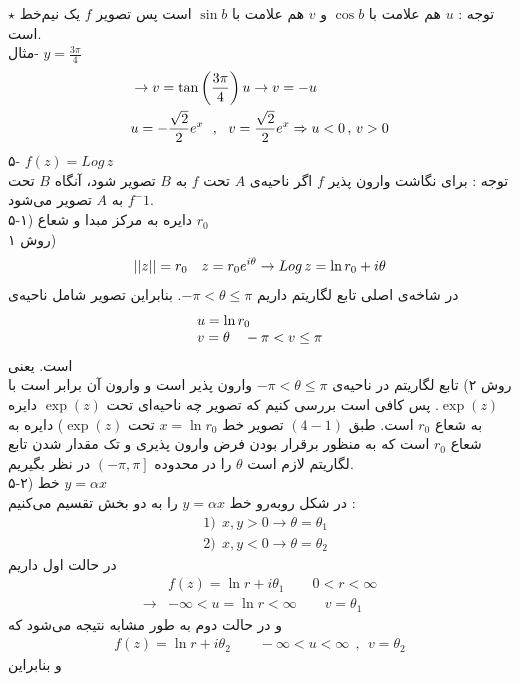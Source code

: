 $\star$
توجه : 
$u$
هم علامت با
$\cos b$
و
$v$
هم علامت با
$\sin b$
است پس تصویر
$f$
یک نیم‌خط است.\\
مثال-
$y=\frac{3\pi}4$
\[\begin{aligned}
& \rightarrow v=\tan\left(\frac{3\pi}4\right)u\rightarrow v=-u
\\ &
u=-\frac{\sqrt2}2e^x \ \ , \ \ v=\frac{\sqrt2}2e^x\Rightarrow u<0 \, , \, v>0
\end{aligned}\]
۵-
$f(z)=Log\, z$\\
توجه : برای نگاشت وارون پذیر
$f$
اگر ناحیه‌ی
$A$
تحت
$f$
به
$B$
تصویر شود، آنگاه
$B$
تحت
$f^-1$
به
$A$
تصویر می‌شود.\\
۵-۱) دایره به مرکز مبدا و شعاع
$r_0$\\
روش ۱)
\[
\left|\left| z \right|\right|=r_0 \quad z=r_0e^{i\theta}\rightarrow Log\, z=\ln {r_0}+i\theta
\]
در شاخه‌ی اصلی تابع لگاریتم داریم
$-\pi<\theta\le\pi$.
بنابراین تصویر شامل ناحیه‌ی
\[
\begin{tabular}{l}
	$u=\ln {r_0}$
	\\
	$v=\theta \quad -\pi<v\le\pi$
\end{tabular}
\]
است. یعنی\\
روش ۲) تابع لگاریتم در ناحیه‌ی
$-\pi<\theta\le\pi$
وارون پذیر است و وارون آن برابر است با
$\exp(z)$.
پس کافی است بررسی کنیم که تصویر چه ناحیه‌ای تحت
$\exp(z)$
دایره به شعاع
$r_0$
است. طبق
$(4-1)$
تصویر خط
$x=\ln{r_0}$
تحت
$\exp(z)$)
دایره به شعاع
$r_0$
است که به منظور برقرار بودن فرض وارون پذیری و تک مقدار شدن تابع لگاریتم لازم است
$\theta$
را در محدوده
$\left(-\pi,\pi\right]$
در نظر بگیریم.\\
۵-۲) خط
$y=\alpha x$\\
در شکل رو‌به‌رو خط
$y=\alpha x$
را به دو بخش تقسیم می‌کنیم :
\[\begin{aligned}
	& 1) \ \ x,y>0\rightarrow \theta=\theta_1
	\\ &
	2) \ \ x,y<0\rightarrow \theta=\theta_2
\end{aligned}\]
در حالت اول داریم
\[\begin{aligned}
	& f(z)=\ln r+i\theta_1\qquad0<r<\infty
	\\ \rightarrow &
	-\infty<u=\ln r<\infty \qquad v=\theta_1
\end{aligned}\]
و در حالت دوم به طور مشابه نتیجه می‌شود که
\[\begin{aligned}
	f(z)=\ln r+i\theta_2 \qquad -\infty<u<\infty \ \ , \ \ v=\theta_2
\end{aligned}\]
و بنابراین\\
